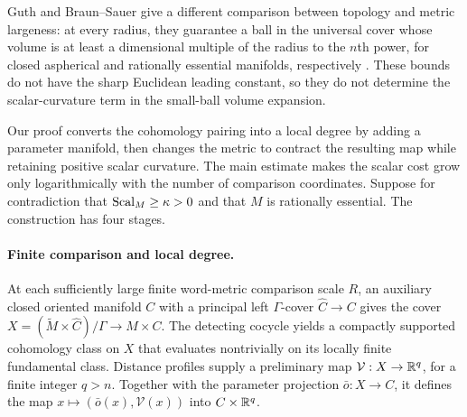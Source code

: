 Guth and Braun--Sauer give a different comparison between topology and
metric largeness: at every radius, they guarantee a ball in the universal
cover whose volume is at least a dimensional multiple of the radius to the
$n$th power, for closed aspherical and rationally essential manifolds,
respectively \cite{Guth2011,BraunSauer2021}. These bounds do not have the
sharp Euclidean leading constant, so they do not determine the scalar-curvature
term in the small-ball volume expansion.

Our proof converts the cohomology pairing into a local degree by adding a
parameter manifold, then changes the metric to contract the resulting map
while retaining positive scalar curvature. The main estimate makes the scalar
cost grow only logarithmically with the number of comparison coordinates.
Suppose for contradiction that $\operatorname{Scal}_M\ge\kappa>0$ and that $M$ is
rationally essential. The construction has four stages.

\paragraph{Finite comparison and local degree.}
At each sufficiently large finite word-metric comparison scale $R$, an
auxiliary closed oriented manifold $C$ with a principal left $\Gamma$-cover
$\widehat C\to C$ gives the cover
$X=(\widetilde M\times\widehat C)/\Gamma\to M\times C$. The detecting cocycle
yields a compactly supported cohomology class on $X$ that evaluates
nontrivially on its locally finite fundamental class. Distance profiles supply a preliminary
map $\mathcal V:X\to\mathbb R^q$, for a finite integer
$q>n$. Together with the parameter projection $\bar o:X\to C$, it defines
the map $x\mapsto(\bar o(x),\mathcal V(x))$ into $C\times\mathbb R^q$.

